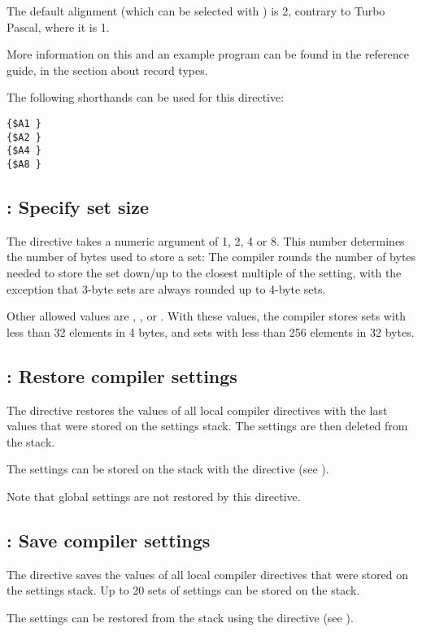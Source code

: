 The default alignment (which can be selected with ) is 2,
contrary to Turbo Pascal, where it is 1.

More information on this and an example program can be found in the reference
guide, in the section about record types.

The following shorthands can be used for this directive:
\begin{verbatim}
{$A1 }
{$A2 }
{$A4 }
{$A8 }
\end{verbatim}

\subsection{ : Specify set size}
\label{se:Packset}
The  directive takes a numeric argument of 1, 2, 4 or 8.
This number determines the number of bytes used to store a set: 
The compiler rounds the number of bytes needed to store the set 
down/up to the closest multiple of the  setting, 
with the exception that 3-byte sets are always rounded up to 4-byte 
sets.

Other allowed values are , , or . 
With these values, the compiler stores sets with less than 32 elements 
in 4 bytes, and sets with less than 256 elements in 32 bytes. 

\subsection{ : Restore compiler settings}
\label{se:Pop}
The  directive restores the values of all local compiler
directives with the last values that were stored on the settings stack. 
The settings are then deleted from the stack.

The settings can be stored on the stack with the  directive
(see ).

Note that global settings are not restored by this directive.

\subsection{ : Save compiler settings}
\label{se:Push}
The  directive saves the values of all local compiler
directives that were stored on the settings stack. Up to 20 sets of
settings can be stored on the stack.

The settings can be restored from the stack using the  directive
(see ).

